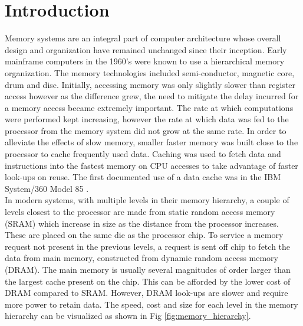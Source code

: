 
%
%

\chapter{Introduction}
\label{introduction}

Memory systems are an integral part of computer architecture whose overall design and organization have remained unchanged since their inception. Early mainframe computers in the 1960's were known to use a hierarchical memory organization. The memory technologies included semi-conductor, magnetic core, drum and disc. Initially, accessing memory was only slightly slower than register access however as the difference grew, the need to mitigate the delay incurred for a memory access became extremely important. The rate at which computations were performed kept increasing, however the rate at which data was fed to the processor from the memory system did not grow at the same rate. In order to alleviate the effects of slow memory, smaller faster memory was built close to the processor to cache frequently used data. Caching was used to fetch data and instructions into the fastest memory on CPU accesses to take advantage of faster look-ups on reuse. The first documented use of a data cache was in the IBM System/360 Model 85 \cite{liptay68}. \\

In modern systems, with multiple levels in their memory hierarchy, a couple of levels closest to the processor are made from static random access memory (SRAM) which increase in size as the distance from the processor increases. These are placed on the same die as the processor chip. To service a memory request not present in the previous levels, a request is sent off chip to fetch the data from main memory, constructed from dynamic random access memory (DRAM). The main memory is usually several magnitudes of order larger than the largest cache present on the chip. This can be afforded by the lower cost of DRAM compared to SRAM. However, DRAM look-ups are slower and require more power to retain data. The speed, cost and size for each level in the memory hierarchy can be visualized as shown in Fig \ref{fig:memory_hierarchy}.

